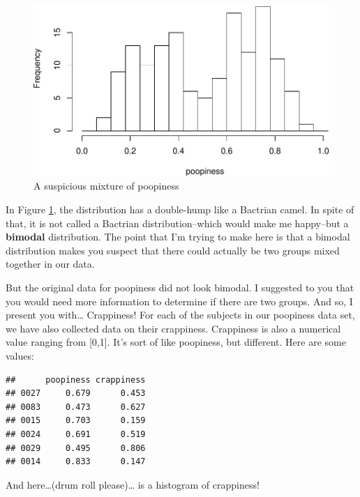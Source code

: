 \documentclass[]{book}
\begin{document}
\begin{figure}
\centering
\includegraphics{bigquestions-book_files/figure-latex/poopy-hist-mixture-suspicious-1.pdf}
\caption{\label{fig:poopy-hist-mixture-suspicious}A suspicious mixture of poopiness}
\end{figure}

In Figure \ref{fig:poopy-hist-mixture-suspicious}, the distribution has a double-hump like a Bactrian camel. In spite of that, it is not called a Bactrian distribution--which would make me happy--but a \textbf{bimodal} distribution. The point that I'm trying to make here is that a bimodal distribution makes you suspect that there could actually be two groups mixed together in our data.

But the original data for poopiness did not look bimodal. I suggested to you that you would need more information to determine if there are two groups. And so, I present you with\ldots{} Crappiness! For each of the subjects in our poopiness data set, we have also collected data on their crappiness. Crappiness is also a numerical value ranging from {[}0,1{]}. It's sort of like poopiness, but different. Here are some values:

\begin{verbatim}
##      poopiness crappiness
## 0027     0.679      0.453
## 0083     0.473      0.627
## 0015     0.703      0.159
## 0024     0.691      0.519
## 0029     0.495      0.806
## 0014     0.833      0.147
\end{verbatim}

And here\ldots{}(drum roll please)\ldots{} is a histogram of crappiness!
\end{document}
